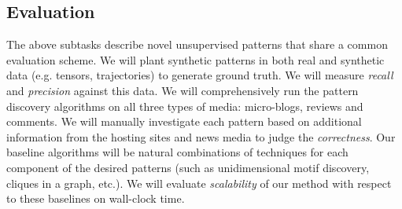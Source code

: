 

\subsection{Evaluation} The above subtasks describe novel unsupervised patterns that share a common evaluation scheme. We will plant synthetic patterns in both real and synthetic data (e.g. tensors, trajectories) to generate ground truth. We will measure {\it recall} and {\it precision} against this data. We will comprehensively run the pattern discovery algorithms on all three types of media: micro-blogs, reviews and comments. We will manually investigate each pattern based on additional information from the hosting sites and news media to judge the {\it correctness}. Our baseline algorithms will be natural combinations of techniques for each component of the desired patterns (such as unidimensional motif discovery, cliques in a graph, etc.). We will evaluate {\it scalability} of our method with respect to these baselines on wall-clock time.
